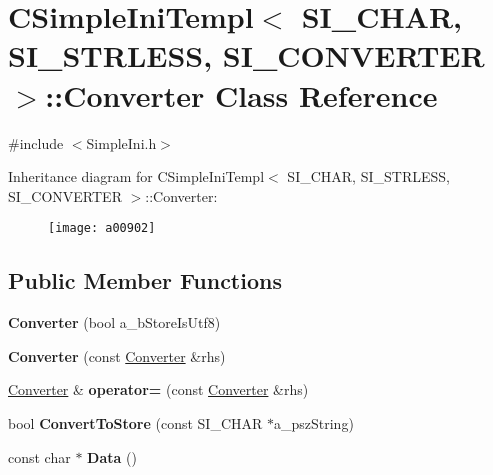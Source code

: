 \hypertarget{a00902}{}\section{C\+Simple\+Ini\+Templ$<$ S\+I\+\_\+\+C\+H\+AR, S\+I\+\_\+\+S\+T\+R\+L\+E\+SS, S\+I\+\_\+\+C\+O\+N\+V\+E\+R\+T\+ER $>$\+:\+:Converter Class Reference}
\label{a00902}


{\ttfamily \#include $<$Simple\+Ini.\+h$>$}

Inheritance diagram for C\+Simple\+Ini\+Templ$<$ S\+I\+\_\+\+C\+H\+AR, S\+I\+\_\+\+S\+T\+R\+L\+E\+SS, S\+I\+\_\+\+C\+O\+N\+V\+E\+R\+T\+ER $>$\+:\+:Converter\+:\begin{figure}[H]
\begin{center}
\leavevmode
\texttt{[image: a00902]}
\end{center}
\end{figure}
\subsection*{Public Member Functions}
\begin{DoxyCompactItemize}
\item 
\mbox{\label{a00902_ab8e740b211e4ece127d4d25773ba7e42}} 
{\bfseries Converter} (bool a\+\_\+b\+Store\+Is\+Utf8)
\item 
\mbox{\label{a00902_a2f6e993014ed5d60c6e890e55beb0805}} 
{\bfseries Converter} (const \hyperlink{a00902}{Converter} \&rhs)
\item 
\mbox{\label{a00902_af858c01c6a7e4ce9fafd18abc9e0ac1b}} 
\hyperlink{a00902}{Converter} \& {\bfseries operator=} (const \hyperlink{a00902}{Converter} \&rhs)
\item 
\mbox{\label{a00902_a4e4186867214b54326cf622e323c9f2f}} 
bool {\bfseries Convert\+To\+Store} (const S\+I\+\_\+\+C\+H\+AR $\ast$a\+\_\+psz\+String)
\item 
\mbox{\label{a00902_a918bbd4f861a2872e148bc9481ac80bb}} 
const char $\ast$ {\bfseries Data} ()
\end{DoxyCompactItemize}


